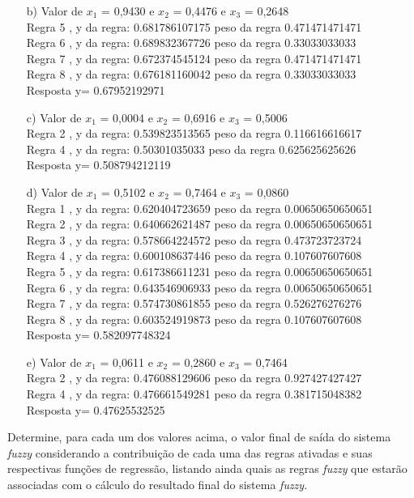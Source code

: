 \documentclass{report}
\begin{document}
\begin{enumerate}
\begin{enumerate}
\item[b)]Valor de $x_1$ = 0,9430 e $x_2$ = 0,4476 e $x_3$ = 0,2648\\
Regra 5 , y da regra: 0.681786107175 peso da regra 0.471471471471 \\
Regra 6 , y da regra: 0.689832367726 peso da regra 0.33033033033 \\
Regra 7 , y da regra: 0.672374545124 peso da regra 0.471471471471 \\
Regra 8 , y da regra: 0.676181160042 peso da regra 0.33033033033 \\
Resposta y= 0.67952192971

\item[c)]Valor de $x_1$ = 0,0004 e $x_2$ = 0,6916 e $x_3$ = 0,5006\\
Regra 2 , y da regra: 0.539823513565 peso da regra 0.116616616617 \\
Regra 4 , y da regra: 0.50301035033 peso da regra 0.625625625626 \\
Resposta y= 0.508794212119

\item[d)]Valor de $x_1$ = 0,5102 e $x_2$ = 0,7464 e $x_3$ = 0,0860\\
Regra 1 , y da regra: 0.620404723659 peso da regra 0.00650650650651 \\
Regra 2 , y da regra: 0.640662621487 peso da regra 0.00650650650651 \\
Regra 3 , y da regra: 0.578664224572 peso da regra 0.473723723724 \\
Regra 4 , y da regra: 0.600108637446 peso da regra 0.107607607608 \\
Regra 5 , y da regra: 0.617386611231 peso da regra 0.00650650650651 \\
Regra 6 , y da regra: 0.643546906933 peso da regra 0.00650650650651 \\
Regra 7 , y da regra: 0.574730861855 peso da regra 0.526276276276 \\
Regra 8 , y da regra: 0.603524919873 peso da regra 0.107607607608 \\
Resposta y= 0.582097748324

\item[e)]Valor de $x_1$ = 0,0611 e $x_2$ = 0,2860 e $x_3$ = 0,7464\\
Regra 2 , y da regra: 0.476088129606 peso da regra 0.927427427427 \\
Regra 4 , y da regra: 0.476661549281 peso da regra 0.381715048382 \\
Resposta y= 0.47625532525

\end{enumerate}
Determine, para cada um dos valores acima, o valor final de saída do sistema \emph{fuzzy}
considerando a contribuição de cada uma das regras ativadas e suas respectivas funções de
regressão, listando ainda quais as regras \emph{fuzzy} que estarão associadas com o cálculo do
resultado final do sistema \emph{fuzzy}.
\end{enumerate}


\newpage
\lstset{basicstyle=\footnotesize}

\end{document}
